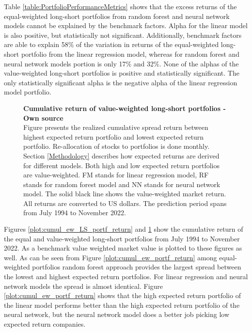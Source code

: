 \documentclass[12pt]{article}
\begin{document}
Table \ref{table:PortfolioPerformanceMetrics} shows that the excess returns of the equal-weighted long-short portfolios from random forest and neural network models cannot be explained by the benchmark factors. Alpha for the linear model is also positive, but statistically not significant. Additionally, benchmark factors are able to explain 58\% of the variation in returns of the equal-weighted long-short portfolio from the linear regression model, whereas for random forest and neural network models portion is only 17\% and 32\%. None of the alphas of the value-weighted long-short portfolios is positive and statistically significant. The only statistically significant alpha is the negative alpha of the linear regression model portfolio. \par

\begin{figure}[ht]
\centering
\caption[Cumulative return of value-weighted long-short portfolios]{\textbf{Cumulative return of value-weighted long-short portfolios \textnormal{- Own source}}\\ Figure presents the realized cumulative spread return between highest expected return portfolio and lowest expected return portfolio. Re-allocation of stocks to portfolios is done monthly. Section \ref{Methodology} describes how expected returns are derived for different models. Both high and low expected return portfolios are value-weighted. FM stands for linear regression model, RF stands for random forest model and NN stands for neural network model. The solid black line shows the value-weighted market return. All returns are converted to US dollars. The prediction period spans from July 1994 to November 2022.}

\label{plot:cumul_vw_LS_portf_return}
\end{figure}

Figures \ref{plot:cumul_ew_LS_portf_return} and \ref{plot:cumul_vw_LS_portf_return} show the cumulative return of the equal and value-weighted long-short portfolios from July 1994 to November 2022. As a benchmark value weighted market value is plotted to these figures as well. As can be seen from Figure \ref{plot:cumul_ew_portf_return} among equal-weighted portfolios random forest approach provides the largest spread between the lowest and highest expected return portfolios. For linear regression and neural network models the spread is almost identical. Figure \ref{plot:cumul_ew_portf_return} shows that the high expected return portfolio of the linear model performs better than the high expected return portfolio of the neural network, but the neural network model does a better job picking low expected return companies. \par
\end{document}
